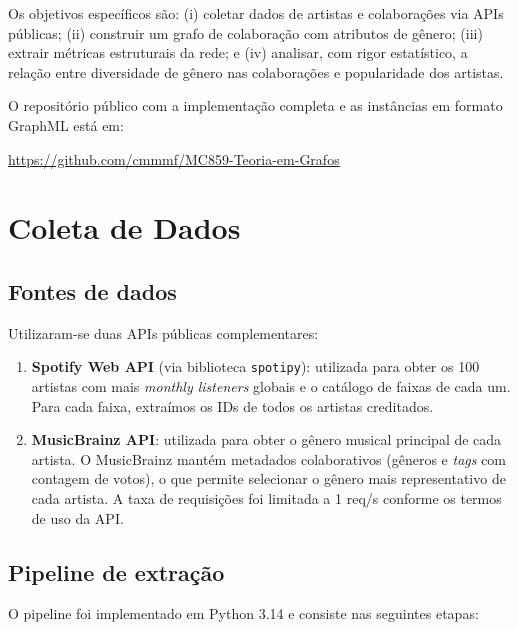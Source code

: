 \documentclass[12pt,a4paper]{article}
\begin{document}
Os objetivos específicos são: (i) coletar dados de artistas e colaborações via APIs públicas; (ii) construir um grafo de colaboração com atributos de gênero; (iii) extrair métricas estruturais da rede; e (iv) analisar, com rigor estatístico, a relação entre diversidade de gênero nas colaborações e popularidade dos artistas.

O repositório público com a implementação completa e as instâncias em formato GraphML está em:
\begin{center}
    \url{https://github.com/cmmmf/MC859-Teoria-em-Grafos}
\end{center}

\section{Coleta de Dados}

\subsection{Fontes de dados}

Utilizaram-se duas APIs públicas complementares:

\begin{enumerate}
    \item \textbf{Spotify Web API} (via biblioteca \texttt{spotipy}): utilizada para obter os 100 artistas com mais \emph{monthly listeners} globais e o catálogo de faixas de cada um. Para cada faixa, extraímos os IDs de todos os artistas creditados.

    \item \textbf{MusicBrainz API}: utilizada para obter o gênero musical principal de cada artista. O MusicBrainz mantém metadados colaborativos (gêneros e \emph{tags} com contagem de votos), o que permite selecionar o gênero mais representativo de cada artista. A taxa de requisições foi limitada a 1 req/s conforme os termos de uso da API.
\end{enumerate}

\subsection{Pipeline de extração}

O pipeline foi implementado em Python 3.14 e consiste nas seguintes etapas:
\end{document}
